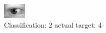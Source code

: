 \begin{figure}[h!]
\begin{center}
\includegraphics[width=0.60\columnwidth]{figures/ID781_class_2_target_4.png}
\end{center}
\caption{ Classification: 2 actual target: 4}
\label{fig:ID781_class_2_target_4}
\end{figure}
